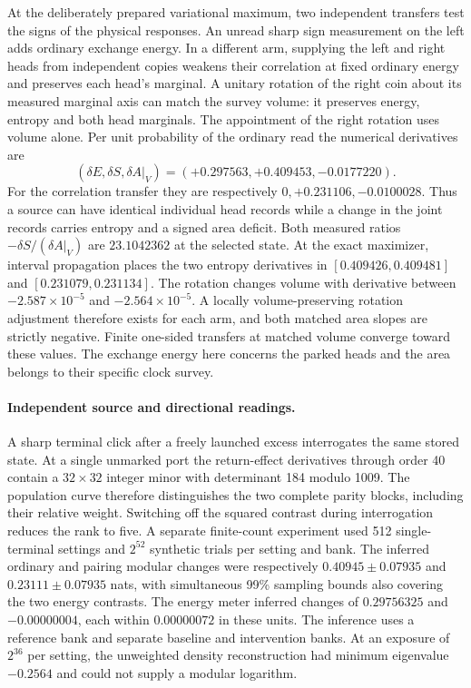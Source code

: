 \documentclass[11pt]{article}
\begin{document}
At the deliberately prepared variational maximum, two independent
transfers test the signs of the physical responses. An
unread sharp sign measurement on the left adds ordinary exchange
energy. In a different arm, supplying the left and right heads
from independent copies weakens their correlation at fixed ordinary
energy and preserves each head's marginal. A unitary rotation of
the right coin about its measured marginal axis can match the
survey volume: it preserves energy, entropy and both head marginals.
The appointment of the right rotation uses volume alone. Per unit
probability of the ordinary read the numerical derivatives are
\[
 (\delta E,\delta S,\delta A|_V)
   =(+0.297563,+0.409453,-0.0177220).
\]
For the correlation transfer they are respectively
$0,+0.231106,-0.0100028$. Thus a source can have identical
individual head records while a change in the joint records carries
entropy and a signed area deficit. Both measured ratios
$-\delta S/(\delta A|_V)$ are $23.1042362$ at the selected state.
At the exact maximizer, interval propagation places the two entropy
derivatives in $[0.409426,0.409481]$ and $[0.231079,0.231134]$.
The rotation changes volume with derivative between
$-2.587\times10^{-5}$ and $-2.564\times10^{-5}$. A locally
volume-preserving rotation adjustment therefore exists for each arm,
and both matched area slopes are strictly negative. Finite one-sided
transfers at matched volume converge toward these values. The exchange energy here concerns the parked heads and the
area belongs to their specific clock survey.

\paragraph{Independent source and directional readings.}
A sharp terminal click after a freely launched excess interrogates the
same stored state. At a single unmarked port the return-effect derivatives
through order 40 contain a $32\times32$ integer minor with determinant
184 modulo 1009. The population curve therefore distinguishes the two
complete parity blocks, including their relative weight. Switching off
the squared contrast during interrogation reduces the rank to five.
A separate finite-count experiment used 512 single-terminal settings
and $2^{52}$ synthetic trials per setting and bank. The inferred
ordinary and pairing modular changes were respectively
$0.40945\pm0.07935$ and $0.23111\pm0.07935$ nats, with simultaneous
99\% sampling bounds also covering the two energy contrasts. The energy
meter inferred changes of $0.29756325$ and $-0.00000004$, each within
$0.00000072$ in these units. The inference uses a reference bank and
separate baseline and intervention banks. At an exposure of $2^{36}$
per setting, the unweighted density reconstruction had minimum
eigenvalue $-0.2564$ and could not supply a modular logarithm.
\end{document}

